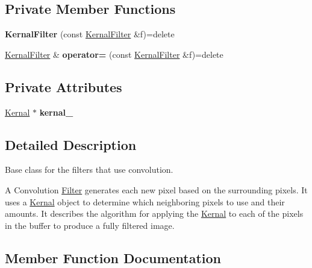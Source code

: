 \subsection*{Private Member Functions}
\begin{DoxyCompactItemize}
\item 
{\bfseries Kernal\+Filter} (const \hyperlink{classKernalFilter}{Kernal\+Filter} \&f)=delete\hypertarget{classKernalFilter_a6758d9ba0fcbea136938fa3e1171103e}{}\label{classKernalFilter_a6758d9ba0fcbea136938fa3e1171103e}

\item 
\hyperlink{classKernalFilter}{Kernal\+Filter} \& {\bfseries operator=} (const \hyperlink{classKernalFilter}{Kernal\+Filter} \&f)=delete\hypertarget{classKernalFilter_ab629d64fcea8094e096d93c0e32a7306}{}\label{classKernalFilter_ab629d64fcea8094e096d93c0e32a7306}

\end{DoxyCompactItemize}
\subsection*{Private Attributes}
\begin{DoxyCompactItemize}
\item 
\hyperlink{classKernal}{Kernal} $\ast$ {\bfseries kernal\+\_\+}\hypertarget{classKernalFilter_afe62c06663cfe91cb4a9e91fdd38085c}{}\label{classKernalFilter_afe62c06663cfe91cb4a9e91fdd38085c}

\end{DoxyCompactItemize}


\subsection{Detailed Description}
Base class for the filters that use convolution. 

A Convolution \hyperlink{classFilter}{Filter} generates each new pixel based on the surrounding pixels. It uses a \hyperlink{classKernal}{Kernal} object to determine which neighboring pixels to use and their amounts. It describes the algorithm for applying the \hyperlink{classKernal}{Kernal} to each of the pixels in the buffer to produce a fully filtered image. 

\subsection{Member Function Documentation}
